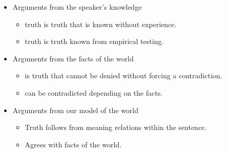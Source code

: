 \documentclass[headrule,footrule]{foils}
\begin{document}
\begin{itemize}
\item Arguments from the speaker's knowledge
\begin{itemize}
\item {} truth is truth that is known without experience.
\item {} truth is truth known from empirical testing.
\end{itemize}
\item Arguments from the facts of the world
  \begin{itemize}
  \item {} is truth that cannot be denied without forcing a
    contradiction.
  \item {} can be contradicted depending on the facts.
  \end{itemize}
\item Arguments from our model of the world
\begin{itemize}
\item {} Truth follows from meaning relations  within the sentence.
\\ 
\item {} Agrees with facts of the world.
\end{itemize}
\end{itemize}




\end{document}
